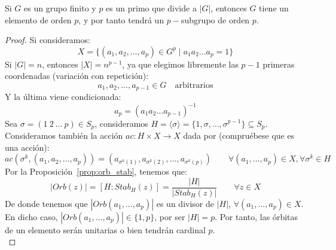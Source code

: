 \begin{teo}[de Cauchy]
    Si $G$ es un grupo finito y $p$ es un primo que divide a $|G|$, entonces $G$ tiene un elemento de orden $p$, y por tanto tendrá un $p-$subgrupo de orden $p$.
    \begin{proof}
        Si consideramos:
        \begin{equation*}
            X = \{(a_1, a_2, \ldots, a_p) \in G^p \mid a_1 a_2 \ldots a_p = 1\}
        \end{equation*}
        Si $|G| = n$, entonces $|X| = n^{p-1}$, ya que elegimos libremente las $p-1$ primeras coordenadas (variación con repetición):
        \begin{equation*}
            a_1, a_2, \ldots, a_{p-1} \in G \quad \text{arbitrarios}
        \end{equation*}
        Y la última viene condicionada:
        \begin{equation*}
            a_p = {(a_1 a_2 \ldots a_{p-1})}^{-1}
        \end{equation*}
        Sea $\sigma = (1\ 2\ \ldots\ p)  \in S_p$, consideramos $H = \langle \sigma \rangle  = \{1, \sigma, \ldots, \sigma^{p-1}\} \subseteq S_p$. Consideramos también la acción $ac:H\times X \to X$ dada por (compruébese que es una acción):
        \begin{equation*}
            ac(\sigma^k, (a_1,a_2,\ldots,a_p)) = \left(a_{\sigma^k(1)}, a_{\sigma^k(2)}, \ldots, a_{\sigma^k(p)}\right) \qquad \forall (a_1,\ldots,a_p)\in X, \forall \sigma^k\in H
        \end{equation*}
        Por la Proposición~\ref{prop:orb_stab}, tenemos que:
        \begin{equation*}
            |Orb(z)| = [H:Stab_H(z)] = \dfrac{|H|}{|Stab_H(z)|} \qquad \forall z\in X
        \end{equation*}
        De donde tenemos que $|Orb(a_1,\ldots,a_p)|$ es un divisor de $|H|$, $\forall (a_1,\ldots,a_p)\in X$. En dicho caso, $|Orb(a_1,\ldots,a_p)|\in \{1,p\}$, por ser $|H| = p$. Por tanto, las órbitas de un elemento serán unitarias o bien tendrán cardinal $p$.\\


\end{proof}
\end{teo}
